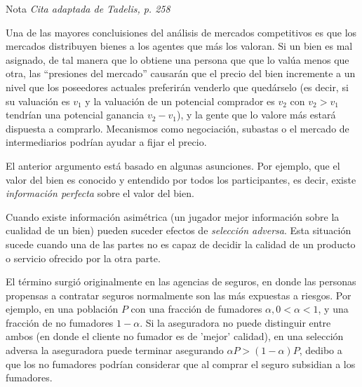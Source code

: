 \documentclass[12pt]{article}
\begin{document}
\begin{mybox}[colback=red!30, coltitle=black]{Nota}
	\textit{Cita adaptada de Tadelis, p. 258}

	Una de las mayores concluisiones del análisis de mercados competitivos es que los mercados distribuyen bienes a los agentes que más los valoran. Si un bien es mal asignado, de tal manera que lo obtiene una persona que que lo valúa menos que otra, las ``presiones del mercado'' causarán que el precio del bien incremente a un nivel que los poseedores actuales preferirán venderlo que quedárselo (es decir, si su valuación es $v_1$ y la valuación de un potencial comprador es $v_2$ con $v_2 > v_1$ tendrían una potencial ganancia $v_2 - v_1$), y la gente que lo valore más estará dispuesta a comprarlo. Mecanismos como negociación, subastas o el mercado de intermediarios podrían ayudar a fijar el precio.

	El anterior argumento está basado en algunas asunciones. Por ejemplo, que el valor del bien es conocido y entendido por todos los participantes, es decir, existe \textit{información perfecta} sobre el valor  del bien.

\end{mybox}

Cuando existe información asimétrica (un jugador mejor información sobre la cualidad de un bien) pueden suceder efectos de \textit{selección adversa}. Esta situación sucede cuando una de las partes no es capaz de decidir la calidad de un producto o servicio ofrecido por la otra parte.

El término surgió originalmente en las agencias de seguros, en donde las personas propensas a contratar seguros normalmente son las más expuestas a riesgos. Por ejemplo, en una población $P$ con una fracción de fumadores $\alpha, 0 < \alpha < 1$, y una fracción de no fumadores $1-\alpha$. Si la aseguradora no puede distinguir entre ambos (en donde el cliente no fumador es de 'mejor' calidad), en una selección adversa la aseguradora puede terminar asegurando $\alpha P > (1-\alpha)P$, dedibo a que los no fumadores podrían considerar que al comprar el seguro subsidian a los fumadores.
\end{document}
